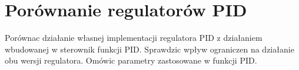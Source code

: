 \section{Porównanie regulatorów PID}
\label{lab:zad13}



\ifdefined\CompileFigures
%    
\fi

Porównac działanie własnej implementacji regulatora PID z działaniem wbudowanej
w sterownik funkcji PID. Sprawdzic wpływ ograniczen na działanie obu wersji regulatora.
Omówic parametry zastosowane w funkcji PID.


\newpage
